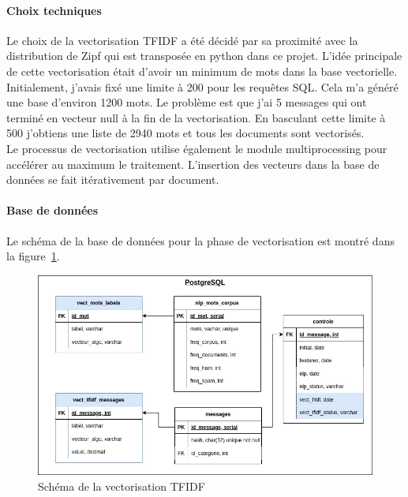         \paragraph{Choix techniques}
            Le choix de la vectorisation TFIDF a été décidé par sa proximité avec la distribution de Zipf qui est transposée en python dans ce projet.
            L'idée principale de cette vectorisation était d'avoir un minimum de mots dans la base vectorielle.
            Initialement, j'avais fixé une limite à 200 pour les requêtes SQL\@.
            Cela m'a généré une base d'environ 1200 mots.
            Le problème est que j'ai 5 messages qui ont terminé en vecteur null à la fin de la vectorisation.
            En basculant cette limite à 500 j'obtiens une liste de 2940 mots et tous les documents sont vectorisés.\\

            Le processus de vectorisation utilise également le module multiprocessing pour accélérer au maximum le traitement.
            L'insertion des vecteurs dans la base de données se fait itérativement par document.

        \paragraph{Base de données}
            Le schéma de la base de données pour la phase de vectorisation est montré dans la figure~\ref{fig:tfidf_bdd}.
            \begin{figure}[H]
                \includegraphics[width=\linewidth]{img/tfidf_bdd}
                \caption{Schéma de la vectorisation TFIDF}
                \label{fig:tfidf_bdd}
            \end{figure}

